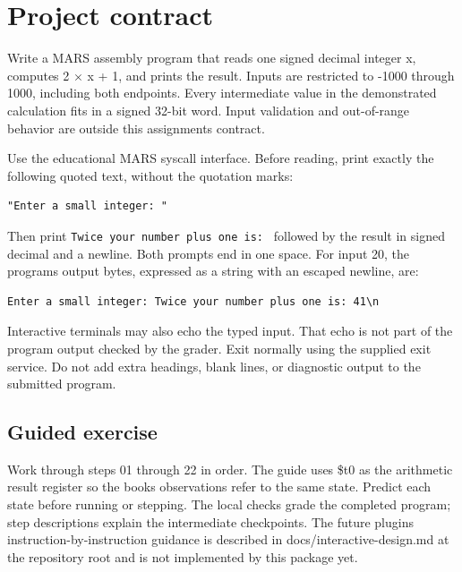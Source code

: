 \section{Project contract}\label{001-console-calculation-assignment-calculate-twice-an-integer-plus-one}

Write a MARS assembly program that reads one signed decimal integer x,
computes 2 \ensuremath{\times} x + 1, and prints the result. Inputs are restricted to
-1000 through 1000, including both endpoints. Every intermediate value
in the demonstrated calculation fits in a signed 32-bit word. Input
validation and out-of-range behavior are outside this
assignment\textquotesingle s contract.

Use the educational MARS syscall interface. Before reading, print
exactly the following quoted text, without the quotation marks:

\begin{verbatim}
"Enter a small integer: "
\end{verbatim}

Then print \texttt{Twice\ your\ number\ plus\ one\ is:\ } followed by
the result in signed decimal and a newline. Both prompts end in one
space. For input 20, the program\textquotesingle s output bytes,
expressed as a string with an escaped newline, are:

\begin{verbatim}
Enter a small integer: Twice your number plus one is: 41\n
\end{verbatim}

Interactive terminals may also echo the typed input. That echo is not
part of the program output checked by the grader. Exit normally using
the supplied exit service. Do not add extra headings, blank lines, or
diagnostic output to the submitted program.

\subsection{Guided
  exercise}\label{001-console-calculation-assignment-guided-exercise}

Work through steps 01 through 22 in order. The guide uses \$t0 as the
arithmetic result register so the book\textquotesingle s observations
refer to the same state. Predict each state before running or stepping.
The local checks grade the completed program; step descriptions explain
the intermediate checkpoints. The future plugin\textquotesingle s
instruction-by-instruction guidance is described in
docs/interactive-design.md at the repository root and is not implemented
by this package yet.

